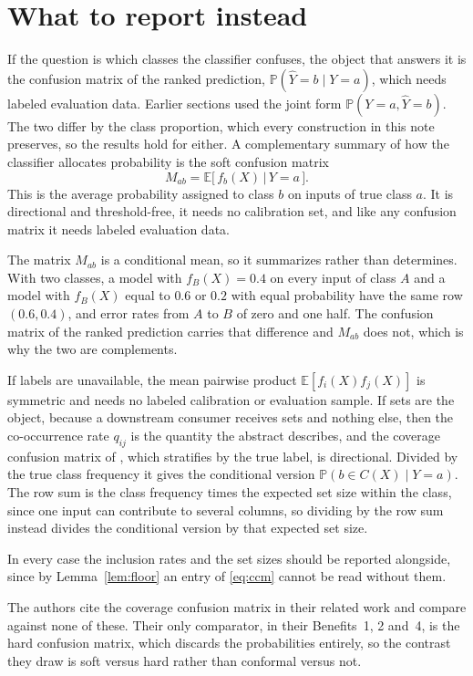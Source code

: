 \documentclass[11pt]{article}
\theoremstyle{definition}
\theoremstyle{definition}
\theoremstyle{remark}
\newcommand{\E}{\mathbb{E}}
\newcommand{\Prob}{\mathbb{P}}
\begin{document}
\section{What to report instead}\label{sec:instead}

If the question is which classes the classifier confuses, the object that answers it is the
confusion matrix of the ranked prediction, $\Prob(\hat Y = b \mid Y = a)$, which needs labeled
evaluation data. Earlier sections used the joint form $\Prob(Y = a, \hat Y = b)$. The two differ by
the class proportion, which every construction in this note preserves, so the results hold for
either. A complementary summary of how the classifier allocates probability is the soft
confusion matrix
\[
M_{ab} = \E\big[\, f_b(X) \,\big|\, Y = a \,\big] .
\]
This is the average probability assigned to class $b$ on inputs of true class $a$. It is directional
and threshold-free, it needs no calibration set, and like any confusion matrix it needs labeled
evaluation data.

The matrix $M_{ab}$ is a conditional mean, so it summarizes rather than determines. With two classes, a model with $f_B(X) = 0.4$ on every input of class $A$ and a model with $f_B(X)$
equal to $0.6$ or $0.2$ with equal probability have the same row $(0.6, 0.4)$, and error rates from $A$ to $B$ of zero and one half.
The confusion matrix of the ranked prediction carries that difference and $M_{ab}$ does not, which is why the two are complements.

If labels are unavailable, the mean pairwise product $\E[f_i(X) f_j(X)]$ is symmetric and needs no labeled calibration or evaluation sample. If sets are the object, because a downstream consumer receives sets and nothing else, then
the co-occurrence rate $q_{ij}$ is the quantity the abstract describes, and the coverage confusion matrix of \citet{stutz2022}, which stratifies by the true label, is
directional. Divided by the true class frequency it gives the conditional version $\Prob(b \in C(X) \mid Y = a)$.
The row sum is the class frequency times the expected set size within the class, since one input
can contribute to several columns, so dividing by the row sum instead divides the conditional
version by that expected set size.

In every case the inclusion rates and the set sizes should be reported alongside, since by
Lemma~\ref{lem:floor} an entry of \eqref{eq:ccm} cannot be read without them.

The authors cite the coverage confusion matrix in their related work and compare against none of
these. Their only comparator, in their Benefits~1, 2 and~4, is the hard confusion matrix,
which discards the probabilities entirely, so the contrast they draw is soft versus hard rather
than conformal versus not.
\end{document}
